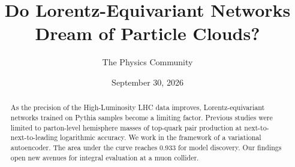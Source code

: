 \documentclass[11pt]{article}
\title{Do Lorentz-Equivariant Networks Dream of Particle Clouds?}
\author{The Physics Community}
\date{September 30, 2026}
\begin{document}
\maketitle
\begin{abstract}
As the precision of the High-Luminosity LHC data improves,
Lorentz-equivariant networks trained on Pythia samples become a limiting
factor. Previous studies were limited to parton-level hemisphere masses
of top-quark pair production at next-to-next-to-leading logarithmic
accuracy. We work in the framework of a variational autoencoder. The
area under the curve reaches 0.933 for model discovery. Our findings
open new avenues for integral evaluation at a muon collider.
\end{abstract}
\tableofcontents




\nocite{*}


\end{document}
